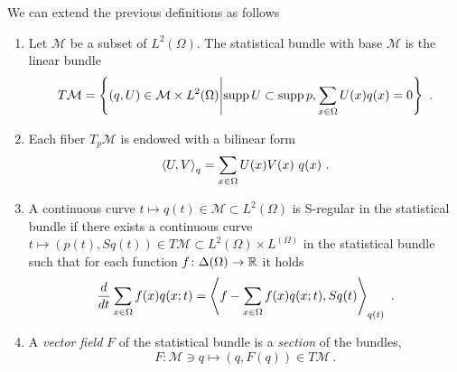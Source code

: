 \documentclass[12pt,a4paper]{amsart}
\begin{document}
We can extend the previous definitions as follows
%
\begin{definition}
\begin{enumerate}
\item Let $\mathcal M$ be a subset of $L^2(\Omega)$. The statistical bundle with base $\mathcal M$ is the linear bundle
%
  \begin{equation*}
    T\mathcal M = \setof{(q,U) \in \mathcal M \times L^2(\Omega)}{\Supp U \subset \Supp p, \sum_{x\in\Omega}  U(x)q(x) = 0} \ .
  \end{equation*}
%
\item Each fiber $T_p\mathcal M$ is endowed with a bilinear form
%
\begin{equation*}
  \scalarat q {U}{V} = \sum_{x\in\Omega} U(x)V(x) \ q(x) \ .
\end{equation*}
\item A continuous curve $t \mapsto q(t) \in \mathcal M \subset L^2(\Omega)$ is S-regular in the statistical bundle if there exists a continuous curve $t \mapsto (p(t),Sq(t)) \in T\mathcal M \subset L^2(\Omega) \times L^(\Omega)$ in the statistical bundle such that for each function $f \colon \SimO \to \reals$ it holds
%
  \begin{equation*}
    \derivby t \sum_{x\in\Omega} f(x) q(x;t) = \scalarat {q(t)} {f - \sum_{x\in\Omega} f(x) q(x;t)}{Sq(t)} \ . 
  \end{equation*}
%
\item A \emph{vector field} $F$ of the statistical bundle is a \emph{section} of the bundles,
%
  \begin{equation*}
    F \colon \mathcal M \ni q \mapsto (q,F(q)) \in T\mathcal M \ . 
  \end{equation*}
%
\end{enumerate}
\end{definition}
\end{document}
